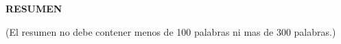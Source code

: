 

\begin{center}
    \textbf{RESUMEN}
\end{center}
\vspace{1cm}

(El resumen no debe contener menos de 100 palabras ni mas de 300 palabras.) 
\newpage